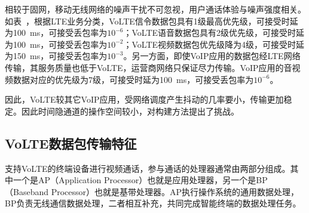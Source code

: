 
相较于固网，移动无线网络的噪声干扰不可忽视，用户通话体验与噪声强度相关。如表\ ，根据LTE业务分类，VoLTE信令数据包具有1级最高优先级，可接受时延为{100\ ms}，可接受丢包率为$10^{-6}$；VoLTE语音数据包具有2级优先级，可接受时延为{100\ ms}，可接受丢包率为$10^{-2}$；VoLTE视频数据包优先级降为4级，可接受时延为{150\ ms}，可接受丢包率为$10^{-3}$。另一方面，即使VoIP应用的数据包经LTE网络传输，其服务质量也低于VoLTE，运营商网络只保证尽力传输。VoIP应用的音视频数据对应的优先级为7级，可接受时延为{100\ ms}，可接受丢包率为$10^{-6}$。

因此，VoLTE较其它VoIP应用，受网络调度产生抖动的几率要小，传输更加稳定。因此时间隐通道的操作空间较小，对构建方法提出了挑战。

\subsection{VoLTE数据包传输特征}
\label{chap:backinfo:volte:packets}
支持VoLTE的终端设备进行视频通话，参与通话的处理器通常由两部分组成。其中一个是AP（Application Processor）也就是应用处理器，另一个是BP（Baseband Processor）也就是基带处理器。AP执行操作系统的通用数据处理，BP负责无线通信数据处理，二者相互补充，共同完成智能终端的数据处理任务。

